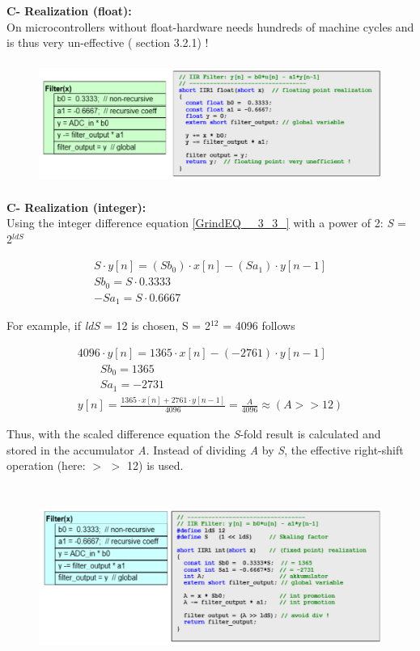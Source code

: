 {\rot\bf C- Realization (float): } \\

On microcontrollers without float-hardware needs hundreds of machine cycles and is thus very un-effective ( section 3.2.1) !

	\begin{figure}[h]
    \centering
    \includegraphics[width=14cm, height=4cm]{Images/image146.png}
    \label{fig:Fig }
    \end{figure}

{\rot\bf C- Realization (integer): } \\

Using the integer difference equation \eqref{GrindEQ__3_3_} with a power of 2: \textit{S} = 2\textit{${}^{ldS\ }$}

\[\begin{array}{l} {S\cdot y[n]=(Sb_{0} )\cdot x[n]-(Sa_{1} )\cdot y[n-1]} \\ {Sb_{0} =S\cdot 0.3333} \\ {-Sa_{1} =S\cdot 0.6667} \end{array}\] 
 
For example, if \textit{ldS} = 12 is chosen, S = 2${}^{12}$ = 4096 follows

\[\begin{array}{l} {4096\cdot y[n]=1365\cdot x[n]-(-2761)\cdot y[n-1]} \\ {\qquad Sb_{0} =1365} \\ {\qquad Sa_{1} =-2731} \\ {y[n]=\frac{1365\cdot x[n]+2761\cdot y[n-1]}{4096} =\frac{A}{4096} \approx (A>>12)} \end{array}\] 

Thus, with the scaled difference equation the \textit{S}-fold result is calculated and stored in the accumulator \textit{A}. Instead of dividing \textit{A} by \textit{S}, the effective right-shift operation (here: $\mathrm{>}$ $\mathrm{>}$ 12) is used.
\newpage

	\begin{figure}[h]
    \centering
    \includegraphics[width=14cm, height=6cm]{Images/image147.png}
    \label{fig:Fig }
    \end{figure}

